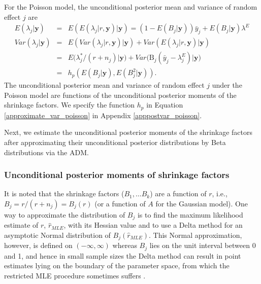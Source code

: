 \documentclass[article]{jss}
\begin{document}
For the Poisson model, the unconditional posterior mean and variance of random effect $j$ are
\begin{eqnarray}
E(\lambda_j\vert \boldsymbol{y}) &=&E(E(\lambda_{j}\vert r, \boldsymbol{y})\vert\boldsymbol{y})=(1-E(B_j\vert\boldsymbol{y}))\bar{y}_j + E(B_j\vert  \boldsymbol{y})\lambda^E\label{postmean_poisson} \\
Var(\lambda_{j}\vert \boldsymbol{y}) &=&  E(Var(\lambda_{j}\vert r,  \boldsymbol{y})\vert \boldsymbol{y})+Var(E(\lambda_{j}\vert r, \boldsymbol{y})\vert \boldsymbol{y})\label{postvar_poisson}\\
&=& E\big(\lambda^{\ast}_{j}/ (r+n_{j})\vert  \boldsymbol{y}\big)+Var\big(\textrm{B}_{j}(\bar{y}_{j}-\lambda^E_{j})\vert \boldsymbol{y}\big) \\
&=&h_p(E(B_j\vert\boldsymbol{y}), E(B^2_j\vert\boldsymbol{y}) ).\label{approximate_var_poisson}
\end{eqnarray}
The unconditional posterior mean and variance of random effect $j$ under the Poisson model are  functions of the unconditional posterior moments of the shrinkage factors. We specify the function $h_p$ in Equation \ref{approximate_var_poisson} in Appendix \ref{apppostvar_poisson}.

Next, we estimate the unconditional posterior moments of the shrinkage factors after approximating their unconditional posterior distributions by Beta distributions via the ADM. 

\subsubsection{Unconditional posterior moments of shrinkage factors}  It is noted that  the shrinkage factors ($B_1, \ldots B_k$) are a function of $r$, i.e., $B_{j}= r/(r+n_{j})=B_{j}(r)$ (or a function of $A$ for the Gaussian model). One way to approximate the distribution of $B_{j}$ is to find the maximum likelihood estimate of $r$, $\hat{r}_{MLE}$, with its Hessian value and to use a Delta method for an asymptotic Normal distribution of $B_{j}(\hat{r}_{MLE})$. This Normal approximation, however, is defined on $(-\infty, \infty)$ whereas $B_{j}$ lies on the unit interval between 0 and 1, and hence in small sample sizes the Delta method can result in point estimates lying on the boundary of the parameter space, from which the restricted MLE procedure sometimes suffers \citep{tang2011, kelly2014advances}.
\end{document}
